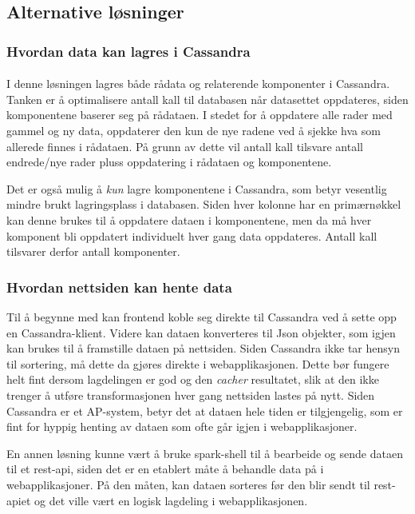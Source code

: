 \subsection{Alternative løsninger}

\subsubsection{Hvordan data kan lagres i Cassandra}
\paragraph{}
I denne løsningen lagres både rådata og relaterende komponenter i Cassandra. Tanken er å optimalisere antall kall til databasen når datasettet oppdateres, siden komponentene baserer seg på rådataen. I stedet for å oppdatere alle rader med gammel og ny data, oppdaterer den kun de nye radene ved å sjekke hva som allerede finnes i rådataen. På grunn av dette vil antall kall tilsvare antall endrede/nye rader pluss oppdatering i rådataen og komponentene.

Det er også mulig å \textit{kun} lagre komponentene i Cassandra, som betyr vesentlig mindre brukt lagringsplass i databasen. Siden hver kolonne har en primærnøkkel kan denne brukes til å oppdatere dataen i komponentene, men da må hver komponent bli oppdatert individuelt hver gang data oppdateres. Antall kall tilsvarer derfor antall komponenter.

\subsubsection{Hvordan nettsiden kan hente data}
Til å begynne med kan frontend koble seg direkte til Cassandra ved å sette opp en Cassandra-klient. Videre kan dataen konverteres til Json objekter, som igjen kan brukes til å framstille dataen på nettsiden. Siden Cassandra ikke tar hensyn til sortering, må dette da gjøres direkte i webapplikasjonen. Dette bør fungere helt fint dersom lagdelingen er god og den \textit{cacher} resultatet, slik at den ikke trenger å utføre transformasjonen hver gang nettsiden lastes på nytt. Siden Cassandra er et AP-system, betyr det at dataen hele tiden er tilgjengelig, som er fint for hyppig henting av dataen som ofte går igjen i webapplikasjoner.

En annen løsning kunne vært å bruke spark-shell til å bearbeide og sende dataen til et rest-api, siden det er en etablert måte å behandle data på i webapplikasjoner. På den måten, kan dataen sorteres før den blir sendt til rest-apiet og det ville vært en logisk lagdeling i webapplikasjonen.

